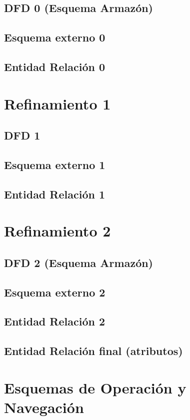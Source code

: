 \documentclass[a4paper,12pt]{report}
\begin{document}
\section{DFD 0 (Esquema Armazón)}
\label{sec-4-1}
\section{Esquema externo 0}
\label{sec-4-2}
\section{Entidad Relación 0}
\label{sec-4-3}
\chapter{Refinamiento 1}
\label{sec-5}
\section{DFD 1}
\label{sec-5-1}
\section{Esquema externo 1}
\label{sec-5-2}
\section{Entidad Relación 1}
\label{sec-5-3}
\chapter{Refinamiento 2}
\label{sec-6}
\section{DFD 2 (Esquema Armazón)}
\label{sec-6-1}
\section{Esquema externo 2}
\label{sec-6-2}
\section{Entidad Relación 2}
\label{sec-6-3}
\section{Entidad Relación final (atributos)}
\label{sec-6-4}
\chapter{Esquemas de Operación y Navegación}
\label{sec-7}
\end{document}
